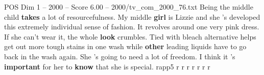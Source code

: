 \begin{textsample}{POS Dim 1 – 2000 – Score 6.00 – 2000/tv\_com\_2000\_76.txt}  \label{ex:f1_pos_072}
Being the middle child \textbf{takes} a lot of resourcefulness.
My middle \textbf{girl} is Lizzie and she 's developed this extremely individual sense of fashion.
It revolves around one very pink dress.
If she can't wear it, the whole \textbf{look} crumbles.
Tied with bleach alternative helps get out more tough stains in one wash while \textbf{other} leading liquids have to go back in the wash again.
She 's going to need a lot of freedom.
I think it 's \textbf{important} for her to \textbf{know} that she is special. rapp5 r r r r r r r

\end{textsample}
